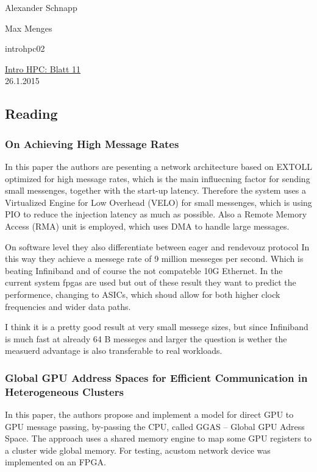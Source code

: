 \documentclass[a4paper,11pt]{scrartcl}
\begin{document}
\hfill Alexander Schnapp

\hfill Max Menges

\hfill introhpc02

\begin{center}
\underline{\Huge{Intro HPC: Blatt 11}}\\
\large{26.1.2015}\\
\end{center}


\subsection{Reading}
\subsubsection{On Achieving High Message Rates}
In this paper the authors are pesenting a network architecture based on EXTOLL optimized for high message rates, which is the main influecning factor for sending small messenges, together with the start-up latency. Therefore the system uses a  
Virtualized Engine for Low Overhead (VELO) for small messenges, which is using PIO to reduce the injection latency as much as possible. Also a  Remote Memory Access (RMA)
unit is employed, which uses DMA to handle large messages.

On software level they also differentiate between
eager and rendevouz protocol
In this way they achieve a messege rate of 9 million messeges per second. Which is beating Infiniband and of course the not compateble 10G Ethernet. In the current system fpgas are used but out of these result they want to predict the performence, changing to ASICs, which shoud allow for both higher clock frequencies and wider data paths.

I think it is a pretty good result at very small messege sizes, but since Infiniband is much fast at already 64 B messeges and larger the question is wether the measuerd advantage is also transferable to real workloads. 


\subsubsection{Global GPU Address Spaces for Efficient
Communication in Heterogeneous Clusters}
In this paper, the authors propose and implement a model for direct GPU to GPU message passing, by-passing the CPU, called GGAS -- Global GPU Adress Space. The approach uses a shared memory engine to map some GPU registers to a cluster wide global memory. For testing, acustom network device was implemented on an FPGA. 
\end{document}
